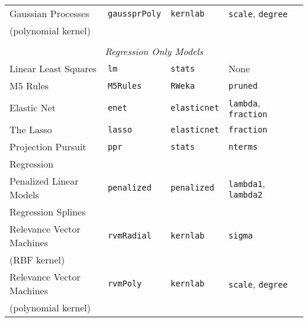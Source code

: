 \documentclass[12pt]{article}
\begin{document}
\begin{longtable}{lllll}
      Gaussian Processes  &
         \texttt{gaussprPoly} & 
            \texttt{kernlab}       & 
            \texttt{scale}, \texttt{degree} \\            
      \:\: (polynomial kernel) & & &\\  
    
      \\
\multicolumn{5}{c}{{{ \em Regression Only Models}}} \\      
    
      Linear Least Squares &
         \texttt{lm} & 
            \texttt{stats}       & 
            None \\  
                   
      M5 Rules &
         \texttt{M5Rules} & 
            \texttt{RWeka}    & 
            \texttt{pruned}  \\             
      
      Elastic Net &
         \texttt{enet} & 
            \texttt{elasticnet}      & 
            \texttt{lambda}, \texttt{fraction} \\          

      The Lasso &
         \texttt{lasso} & 
            \texttt{elasticnet}      & 
            \texttt{fraction} \\       

      Projection Pursuit   &
         \texttt{ppr} & 
            \texttt{stats}       & 
            \texttt{nterms} \\            
      \:\: Regression & & &\\                   
            
      Penalized Linear Models  &
         \texttt{penalized} & 
            \texttt{penalized}       & 
            \texttt{lambda1}, \texttt{lambda2} \\            
      \:\: Regression Splines & & &\\
      
      Relevance Vector Machines  &
         \texttt{rvmRadial} & 
            \texttt{kernlab}       & 
            \texttt{sigma} \\            
      \:\: (RBF kernel) & & &\\   
      
      Relevance Vector Machines  &
         \texttt{rvmPoly} & 
            \texttt{kernlab}       & 
            \texttt{scale}, \texttt{degree} \\            
      \:\: (polynomial kernel) & & &\\               


\end{longtable}
\end{document}
